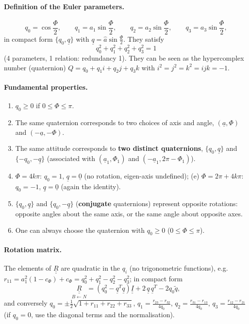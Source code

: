 \paragraph{Definition of the Euler parameters.}
\begin{equation}
q_{0}=\cos\frac{\Phi}{2},\qquad q_{1}=a_{1}\sin\frac{\Phi}{2},\qquad q_{2}=a_{2}\sin\frac{\Phi}{2},\qquad q_{3}=a_{3}\sin\frac{\Phi}{2},
\end{equation}
in compact form $\{q_0,\underline q\}$ with $\underline q=\hat a\sin\frac\Phi2$. They satisfy
\begin{equation}
q_{0}^{2}+q_{1}^{2}+q_{2}^{2}+q_{3}^{2}=1
\end{equation}
(4 parameters, 1 relation: redundancy 1). They can be seen as the hypercomplex number (quaternion) $Q=q_0+q_1i+q_2j+q_3k$ with
$i^2=j^2=k^2=ijk=-1$.

\paragraph{Fundamental properties.}
\begin{enumerate}[label=(\alph*)]
\item $q_0\ge0$ if $0\le\Phi\le\pi$.
\item The same quaternion corresponds to two choices of axis and angle, $(\underline a,\Phi)$ and $(-\underline a,-\Phi)$.
\item The same attitude corresponds to \textbf{two distinct quaternions}, $\{q_0,\underline q\}$ and $\{-q_0,-\underline q\}$ (associated with
$(\underline a_1,\Phi_1)$ and $(-\underline a_1,2\pi-\Phi_1)$).
\item $\Phi=4k\pi$: $q_0=1$, $\underline q=\underline 0$ (no rotation, eigen-axis undefined); (e) $\Phi=2\pi+4k\pi$: $q_0=-1$, $\underline q=\underline 0$ (again the identity).
\item $\{q_0,\underline q\}$ and $\{q_0,-\underline q\}$ (\textbf{conjugate} quaternions) represent opposite rotations: opposite angles about the same axis, or the
same angle about opposite axes.
\item One can always choose the quaternion with $q_0\ge0$ ($0\le\Phi\le\pi$).
\end{enumerate}

\paragraph{Rotation matrix.} The elements of $\underline{\underline R}$ are quadratic in the $q_i$ (no trigonometric functions), e.g.\
$r_{11}=a_1^2(1-c_\Phi)+c_\Phi=q_0^2+q_1^2-q_2^2-q_3^2$; in compact form
\begin{equation}
\underset{B\leftarrow N}{\underline{\underline R}}=\left(q_0^2-\underline q^T\underline q\right)\underline{\underline I}+2\,\underline q\,\underline q^T-2q_0\tilde q,
\end{equation}
and conversely $q_0=\pm\frac12\sqrt{1+r_{11}+r_{22}+r_{33}}$, $q_1=\frac{r_{23}-r_{32}}{4q_0}$, $q_2=\frac{r_{31}-r_{13}}{4q_0}$,
$q_3=\frac{r_{12}-r_{21}}{4q_0}$ (if $q_0=0$, use the diagonal terms and the normalisation).

